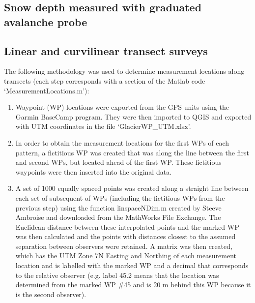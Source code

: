 \documentclass{sfuthesis}
\begin{document}
\begin{appendices}
\section{Snow depth measured with graduated avalanche probe}
\subsection{Linear and curvilinear transect surveys}
\label{app:transect_calc}

 The following methodology was used to determine measurement locations along transects (each step corresponds with a section of the Matlab code `MeasurementLocations.m'): 
\begin{enumerate}
	\item Waypoint (WP) locations were exported from the GPS units using the Garmin BaseCamp program. They were then imported to QGIS and exported with UTM coordinates in the file `GlacierWP\_UTM.xlsx'. 
	\item In order to obtain the measurement locations for the first WPs of each pattern, a fictitious WP was created that was along the line between the first and second WPs, but located ahead of the first WP. These fictitious waypoints were then inserted into the original data. 
	\item A set of 1000 equally spaced points was created along a straight line between each set of subsequent of WPs (including the fictitious WPs from the previous step) using the function linspaceNDim.m created by Steeve Ambroise and downloaded from the MathWorks File Exchange. The Euclidean distance between these interpolated points and the marked WP was then calculated and the points with distances closest to the assumed separation between observers were retained. A matrix was then created, which has the UTM Zone 7N Easting and Northing of each measurement location and is labelled with the marked WP and a decimal that corresponds to the relative observer (e.g. label 45.2 means that the location was determined from the marked WP \#45 and is 20 m behind this WP because it is the second observer). 
\end{enumerate}


\end{appendices}
\end{document}
